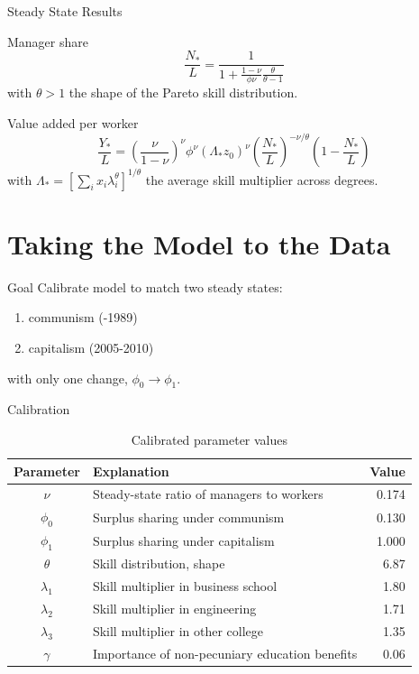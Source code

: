 \documentclass[
  ignorenonframetext,
  aspectratio=1610,
]{beamer}
\providecommand{\tightlist}{%
  \setlength{\itemsep}{0pt}\setlength{\parskip}{0pt}}
\let\oldsection\section
\renewcommand{\section}{
  \addtocounter{framenumber}{-1} %
  \oldsection
}
\begin{document}
\begin{frame}{Steady State Results}
\protect\hypertarget{steady-state-results}{}
\begin{block}{Manager share}
\protect\hypertarget{manager-share}{}
\[
\frac{N_*}{L} = \frac 1{1+  
\frac {1-\nu}{\phi\nu}
\frac {\theta}{\theta - 1}}
\] with \(\theta>1\) the shape of the Pareto skill distribution.

\pause
\end{block}

\begin{block}{Value added per worker}
\protect\hypertarget{value-added-per-worker}{}
\[
\frac{Y_*}{L} = 
\left(\frac{\nu}{1-\nu} \right)^\nu
\phi^\nu
(\Lambda_* z_0)^\nu
\left(\frac {N_*}{L}
\right)^{-\nu/\theta}
\left(1-\frac {N_*}{L}
\right)
\] with
\(\Lambda_* = \left[\sum_i x_i \lambda_i^\theta \right]^{1/\theta}\) the
average skill multiplier across degrees.
\end{block}
\end{frame}

\section{Taking the Model to the
Data}\label{taking-the-model-to-the-data}

\begin{frame}{Goal}
\protect\hypertarget{goal}{}
Calibrate model to match two steady states:

\begin{enumerate}
\tightlist
\item
  communism (-1989)
\item
  capitalism (2005-2010)
\end{enumerate}

with only one change, \(\phi_0 \to \phi_1\).
\end{frame}

\begin{frame}{Calibration}
\protect\hypertarget{calibration}{}
\begin{table}[ht!]
\centering
\caption{Calibrated parameter values}   
\begin{tabular}{clr}
  \hline
Parameter & Explanation & Value \\
    \hline
$\nu$ & Steady-state ratio of managers to workers & 0.174 \\
$\phi_0$ & Surplus sharing under communism & 0.130 \\
$\phi_1$ & Surplus sharing under capitalism & 1.000 \\
$\theta$ & Skill distribution, shape & 6.87 \\
$\lambda_1$ & Skill multiplier in business school & 1.80 \\
$\lambda_2$ & Skill multiplier in engineering & 1.71 \\
$\lambda_3$ & Skill multiplier in other college & 1.35 \\
$\gamma$ & Importance of non-pecuniary education benefits & 0.06 \\
    \hline
\end{tabular}
\end{table}
\end{frame}
\end{document}
